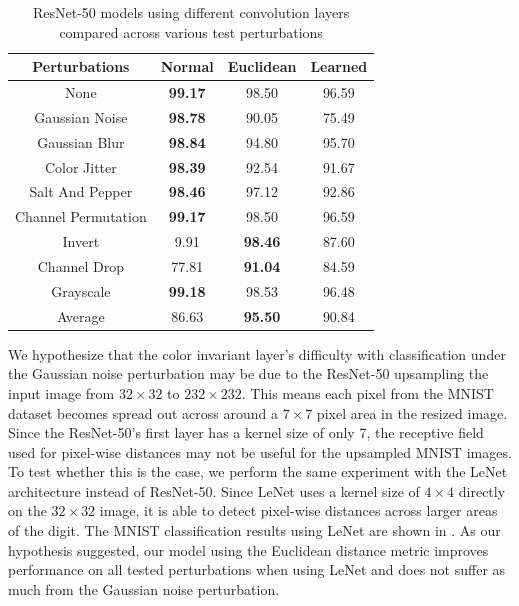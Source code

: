 \documentclass[10pt,twocolumn,letterpaper]{article}
\begin{document}
\begin{table}[h!]
    \centering
    \begin{tabular}{||c | c c c||}
        \hline
        Perturbations       & Normal         & Euclidean      & Learned \\ [0.5ex]
        \hline\hline
        None                & \textbf{99.17} & 98.50          & 96.59   \\
        Gaussian Noise      & \textbf{98.78} & 90.05          & 75.49   \\
        Gaussian Blur       & \textbf{98.84} & 94.80          & 95.70   \\
        Color Jitter        & \textbf{98.39} & 92.54          & 91.67   \\
        Salt And Pepper     & \textbf{98.46} & 97.12          & 92.86   \\
        Channel Permutation & \textbf{99.17} & 98.50          & 96.59   \\
        Invert              & 9.91           & \textbf{98.46} & 87.60   \\
        Channel Drop        & 77.81          & \textbf{91.04} & 84.59   \\
        Grayscale           & \textbf{99.18} & 98.53          & 96.48   \\
        \hline
        Average             & 86.63          & \textbf{95.50} & 90.84   \\
        \hline
    \end{tabular}
    \caption{ResNet-50 models using different convolution layers compared across various test perturbations}
    \label{table1}
\end{table}

We hypothesize that the color invariant layer's difficulty with classification under the Gaussian noise perturbation may be due to the ResNet-50 upsampling the input image from $32\times32$ to $232\times232$. This means each pixel from the MNIST dataset becomes spread out across around a $7\times7$ pixel area in the resized image. Since the ResNet-50's first layer has a kernel size of only 7, the receptive field used for pixel-wise distances may not be useful for the upsampled MNIST images. To test whether this is the case, we perform the same experiment with the LeNet \cite{LeCun98} architecture instead of ResNet-50. Since LeNet uses a kernel size of $4\times4$ directly on the $32\times32$ image, it is able to detect pixel-wise distances across larger areas of the digit. The MNIST classification results using LeNet are shown in . As our hypothesis suggested, our model using the Euclidean distance metric improves performance on all tested perturbations when using LeNet and does not suffer as much from the Gaussian noise perturbation.
\end{document}
